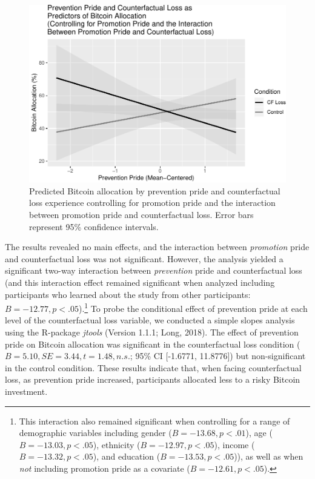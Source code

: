 \documentclass[man,floatsintext]{apa6}
\let\rmarkdownfootnote\footnote%
\def\footnote{\protect\rmarkdownfootnote}
\begin{document}
\begin{figure}

{\centering \includegraphics[width=0.9\linewidth,height=0.9\textheight]{rfcfloss_manuscript_files/figure-latex/primarymodelplot-1} 

}

\caption{Predicted Bitcoin allocation by prevention pride and counterfactual loss experience controlling for promotion pride and the interaction between promotion pride and counterfactual loss. Error bars represent 95\% confidence intervals.}\label{fig:primarymodelplot}
\end{figure}

The results revealed no main effects, and the interaction between \emph{promotion} pride and counterfactual loss was not significant. However, the analysis yielded a significant two-way interaction between \emph{prevention} pride and counterfactual loss (and this interaction effect remained significant when analyzed including participants who learned about the study from other participants: \(B = -12.77, p < .05\)).\footnote{This interaction also remained significant when controlling for a range of demographic variables including gender (\(B = -13.68, p < .01\)), age (\(B = -13.03, p < .05\)), ethnicity (\(B = -12.97, p < .05\)), income (\(B = -13.32, p < .05\)), and education (\(B = -13.53, p < .05\))), as well as when \emph{not} including promotion pride as a covariate (\(B = -12.61, p < .05\)).} To probe the conditional effect of prevention pride at each level of the counterfactual loss variable, we conducted a simple slopes analysis using the R-package \emph{jtools} (Version 1.1.1; Long, 2018). The effect of prevention pride on Bitcoin allocation was significant in the counterfactual loss condition (\(B = 5.10, SE = 3.44, t = 1.48, n.s.\); 95\% CI {[}-1.6771, 11.8776{]}) but non-significant in the control condition. These results indicate that, when facing counterfactual loss, as prevention pride increased, participants allocated less to a risky Bitcoin investment.
\end{document}
